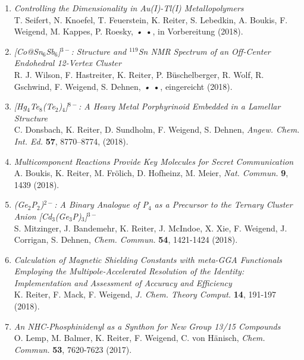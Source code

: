 \begin{enumerate}

\item \textit{Controlling the Dimensionality in Au(I)-Tl(I) Metallopolymers}\\
T. Seifert, N. Knoefel, T. Feuerstein, K. Reiter, S. Lebedkin, A. Boukis, F. Weigend, M. Kappes, P. Roesky, \textit{•} \textbf{•}, in Vorbereitung (2018).

\item \textit{[Co@Sn$_6$Sb$_6$]$^{3-}$: Structure and $^{119}$Sn NMR Spectrum of an Off-Center Endohedral 12-Vertex Cluster}\\
R. J. Wilson, F. Hastreiter, K. Reiter, P. Büschelberger, R. Wolf, R. Gschwind, F. Weigend, S. Dehnen, \textit{•} \textbf{•}, eingereicht (2018).

\item \textit{[Hg$_4$Te$_8$(Te$_2$)$_4$]$^{8-}$: A Heavy Metal Porphyrinoid Embedded in a Lamellar Structure}\\
C. Donsbach, K. Reiter, D. Sundholm, F. Weigend, S. Dehnen, \textit{Angew. Chem. Int. Ed.} \textbf{57}, 8770–8774, (2018).

\item \textit{Multicomponent Reactions Provide Key Molecules for Secret Communication}\\ 
A. Boukis, K. Reiter, M. Frölich, D. Hofheinz, M. Meier, \textit{Nat. Commun.} \textbf{9}, 1439 (2018).

\item \textit{(Ge$_2$P$_2$)$^{2-}$: A Binary Analogue of P$_4$ as a Precursor to the Ternary Cluster Anion [Cd$_3$(Ge$_3$P)$_3$]$^{3-}$}\\
S. Mitzinger, J. Bandemehr, K. Reiter, J. McIndoe, X. Xie, F. Weigend, J. Corrigan, S. Dehnen, \textit{Chem. Commun.} \textbf{54}, 1421-1424 (2018).

\item \textit{Calculation of Magnetic Shielding Constants with meta-GGA Functionals Employing the Multipole-Accelerated Resolution of the Identity: Implementation and Assessment of Accuracy and Efficiency}\\ 
K. Reiter, F. Mack, F. Weigend, \textit{J. Chem. Theory Comput.} \textbf{14}, 191-197 (2018).

\item \textit{An NHC-Phosphinidenyl as a Synthon for New Group 13/15 Compounds}\\
O. Lemp, M. Balmer, K. Reiter, F. Weigend, C. von Hänisch, \textit{Chem. Commun.} \textbf{53}, 7620-7623 (2017).


\end{enumerate}

